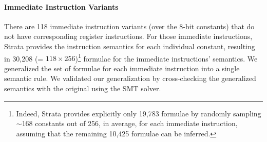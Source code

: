 \paragraph{Immediate Instruction Variants}

There are 118 immediate instruction variants (over the 8-bit constants) that do not have corresponding register instructions.
For those immediate instructions, Strata provides the instruction semantics for each individual constant, resulting in 30,208 (= $118 \times 256$)\footnote{Indeed, Strata provides explicitly only 19,783 formulae by randomly sampling $\sim$168 constants out of 256, in average, for each immediate instruction, assuming that the remaining 10,425 formulae can be inferred.} formulae for the immediate instructions' semantics.
We generalized the set of formulae for each immediate instruction into a single semantic rule.
We validated our generalization by cross-checking the generalized semantics with the original using the SMT solver.






